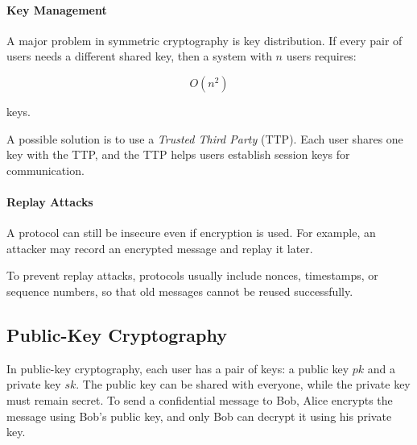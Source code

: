 


\paragraph{Key Management}

A major problem in symmetric cryptography is key distribution. If every
pair of users needs a different shared key, then a system with $n$ users
requires:

\[
O(n^2)
\]

keys.

A possible solution is to use a \emph{Trusted Third Party} (TTP). Each
user shares one key with the TTP, and the TTP helps users establish
session keys for communication.

\paragraph{Replay Attacks}

A protocol can still be insecure even if encryption is used. For example,
an attacker may record an encrypted message and replay it later.

To prevent replay attacks, protocols usually include nonces, timestamps,
or sequence numbers, so that old messages cannot be reused successfully.

\subsection{Public-Key Cryptography}

In public-key cryptography, each user has a pair of keys: a public key
$pk$ and a private key $sk$. The public key can be shared with everyone,
while the private key must remain secret. To send a confidential message
to Bob, Alice encrypts the message using Bob's public key, and only Bob
can decrypt it using his private key.

